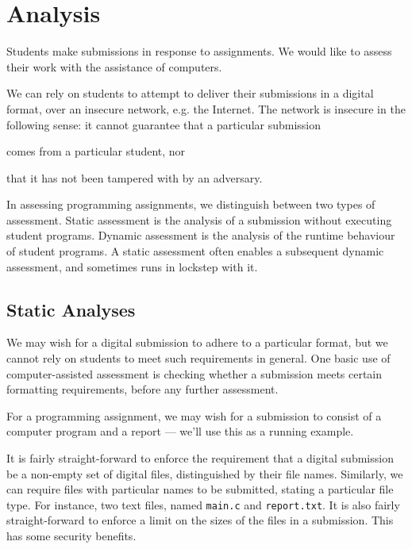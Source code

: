 
\chapter{Analysis}

Students make submissions in response to assignments. We would like to assess
their work with the assistance of computers.

We can rely on students to attempt to deliver their submissions in a digital
format, over an insecure network, e.g. the Internet. The network is insecure in
the following sense: it cannot guarantee that a particular submission
\begin{inparaenum}[(a)] \item comes from a particular student, nor \item that
it has not been tampered with by an adversary.\end{inparaenum}

In assessing programming assignments, we distinguish between two types of
assessment. Static assessment is the analysis of a submission without executing
student programs. Dynamic assessment is the analysis of the runtime behaviour
of student programs. A static assessment often enables a subsequent dynamic
assessment, and sometimes runs in lockstep with it.

\section{Static Analyses}

We may wish for a digital submission to adhere to a particular format, but we
cannot rely on students to meet such requirements in general. One basic use of
computer-assisted assessment is checking whether a submission meets certain
formatting requirements, before any further assessment.

For a programming assignment, we may wish for a submission to consist of a
computer program and a report --- we'll use this as a running example.

It is fairly straight-forward to enforce the requirement that a digital
submission be a non-empty set of digital files, distinguished by their file
names. Similarly, we can require files with particular names to be submitted,
stating a particular file type.  For instance, two text files, named
\texttt{main.c} and \texttt{report.txt}. It is also fairly straight-forward to
enforce a limit on the sizes of the files in a submission.  This has some
security benefits. %

